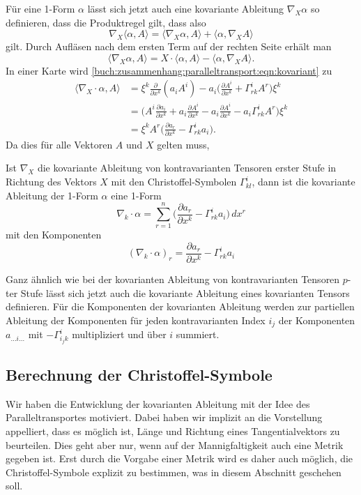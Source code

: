 Für eine 1-Form $\alpha$ lässt sich jetzt auch eine kovariante Ableitung
$\nabla_X\alpha$ so definieren, dass die Produktregel gilt, dass also
\[
\nabla_X
\langle \alpha, A\rangle
=
\langle \nabla_X\alpha,A\rangle
+
\langle \alpha,\nabla_X A\rangle
\]
gilt.
Durch Aufläsen nach dem ersten Term auf der rechten Seite erhält man
\begin{equation}
\langle \nabla_X\alpha,A\rangle
=
X
\cdot
\langle \alpha, A\rangle
-
\langle \alpha,\nabla_X A\rangle.
\label{buch:zusammenhang:paralleltransport:eqn:kovariant}
\end{equation}
In einer Karte wird 
\eqref{buch:zusammenhang:paralleltransport:eqn:kovariant}
zu
\begin{align*}
\langle
\nabla_X\cdot\alpha, A
\rangle
&=
\xi^k
\frac{\partial}{\partial x^k} (a_i A^i)
-
a_i
\biggl(
\frac{\partial A^i}{\partial x^k}
+
\Gamma^i_{rk} A^r
\biggr)
\xi^k
\\
&=
\biggl(
A^i
\frac{\partial a_i}{\partial x^k}
+
a_i
\frac{\partial A^i}{\partial x^k}
-
a_i
\frac{\partial A^i}{\partial x^k}
-
a_i
\Gamma^i_{rk} A^r
\biggr)
\xi^k
\\
&=
\xi^k A^r
\biggl(
\frac{\partial a_r}{\partial x^k}
-
\Gamma^i_{rk}a_i
\biggr).
\end{align*}
Da dies für alle Vektoren $A$ und $X$ gelten muss, 

\begin{definition}
Ist $\nabla_X$ die kovariante Ableitung von kontravarianten
Tensoren erster Stufe in Richtung des Vektors $X$ mit den
Christoffel-Symbolen $\Gamma^i_{kl}$,
dann ist die kovariante Ableitung
der 1-Form $\alpha$ eine 1-Form
\[
\nabla_k\cdot\alpha
=
\sum_{r=1}^n
\biggl(
\frac{\partial a_r}{\partial x^k} - \Gamma^i_{rk}a_i
\biggr)
\,dx^r
\]
mit den Komponenten
\[
(\nabla_k\cdot\alpha)_r
=
\frac{\partial a_r}{\partial x^k} - \Gamma^i_{rk}a_i
\]
\end{definition}

Ganz ähnlich wie bei der kovarianten Ableitung von kontravarianten
Tensoren $p$-ter Stufe lässt sich jetzt auch die kovariante
Ableitung eines kovarianten Tensors definieren.
Für die Komponenten der kovarianten Ableitung werden zur partiellen
Ableitung der Komponenten für jeden kontravarianten Index $i_j$ der
Komponenten $a_{\dots i\dots}$ mit $-\Gamma^{i}_{i_jk}$ multipliziert
und über $i$ summiert.

%
%
\subsection{Berechnung der Christoffel-Symbole
\label{buch:zusammenhang:subsection:christoffel}}
Wir haben die Entwicklung der kovarianten Ableitung mit der Idee des
Paralleltransportes motiviert.
Dabei haben wir implizit an die Vorstellung appelliert, dass es
möglich ist, Länge und Richtung eines Tangentialvektors zu beurteilen.
Dies geht aber nur, wenn auf der Mannigfaltigkeit auch eine Metrik
gegeben ist.
Erst durch die Vorgabe einer Metrik wird es daher auch möglich, die
Christoffel-Symbole explizit zu bestimmen, was in diesem Abschnitt
geschehen soll.

